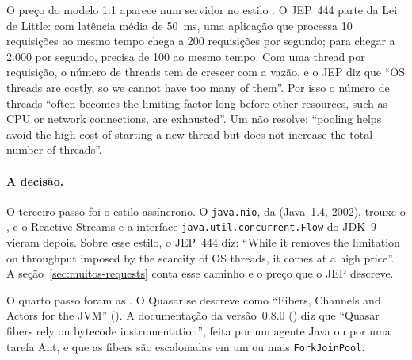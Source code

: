 O preço do modelo 1:1 aparece num servidor no estilo
. O JEP~444 parte
da Lei de Little: com latência média de 50~ms, uma aplicação que
processa 10 requisições ao mesmo tempo chega a 200 requisições por
segundo; para chegar a 2.000 por segundo, precisa de 100 ao mesmo
tempo. Com uma thread por requisição, o número de threads tem de
crescer com a vazão, e o JEP diz que \enquote{OS threads are costly, so
we cannot have too many of them}. Por isso o número de threads
\enquote{often becomes the limiting factor long before other
resources, such as CPU or network connections, are exhausted}. Um
 não resolve:
\enquote{pooling helps avoid the high cost of starting a new thread but
does not increase the total number of threads}.

\paragraph{A decisão.}
O terceiro passo foi o estilo assíncrono. O \texttt{java.nio}, da
 (Java~1.4, 2002), trouxe o , e o
Reactive Streams e a interface \texttt{java.util.concurrent.Flow} do
JDK~9 vieram depois. Sobre esse estilo, o JEP~444 diz: \enquote{While
it removes the limitation on throughput imposed by the scarcity of OS
threads, it comes at a high price}. A seção~\ref{sec:muitos-requests}
conta esse caminho e o preço que o JEP descreve.

O quarto passo foram as . O Quasar se descreve como \enquote{Fibers, Channels and Actors for the
JVM} (). A documentação da versão~0.8.0
() diz que \enquote{Quasar fibers rely on
bytecode instrumentation}, feita por um agente Java ou por uma tarefa
Ant, e que as fibers são escalonadas em um ou mais
\texttt{ForkJoinPool}.


